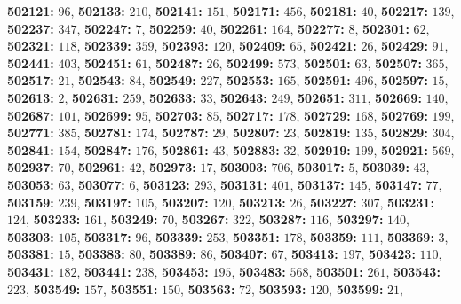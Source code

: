 \textsf{\bfseries 502121:} $96$, \textsf{\bfseries 502133:} $210$, \textsf{\bfseries 502141:} $151$, \textsf{\bfseries 502171:} $456$, \textsf{\bfseries 502181:} $40$, \textsf{\bfseries 502217:} $139$, \textsf{\bfseries 502237:} $347$, \textsf{\bfseries 502247:} $7$, \textsf{\bfseries 502259:} $40$, \textsf{\bfseries 502261:} $164$, \textsf{\bfseries 502277:} $8$, \textsf{\bfseries 502301:} $62$, \textsf{\bfseries 502321:} $118$, \textsf{\bfseries 502339:} $359$, \textsf{\bfseries 502393:} $120$, \textsf{\bfseries 502409:} $65$, \textsf{\bfseries 502421:} $26$, \textsf{\bfseries 502429:} $91$, \textsf{\bfseries 502441:} $403$, \textsf{\bfseries 502451:} $61$, \textsf{\bfseries 502487:} $26$, \textsf{\bfseries 502499:} $573$, \textsf{\bfseries 502501:} $63$, \textsf{\bfseries 502507:} $365$, \textsf{\bfseries 502517:} $21$, \textsf{\bfseries 502543:} $84$, \textsf{\bfseries 502549:} $227$, \textsf{\bfseries 502553:} $165$, \textsf{\bfseries 502591:} $496$, \textsf{\bfseries 502597:} $15$, \textsf{\bfseries 502613:} $2$, \textsf{\bfseries 502631:} $259$, \textsf{\bfseries 502633:} $33$, \textsf{\bfseries 502643:} $249$, \textsf{\bfseries 502651:} $311$, \textsf{\bfseries 502669:} $140$, \textsf{\bfseries 502687:} $101$, \textsf{\bfseries 502699:} $95$, \textsf{\bfseries 502703:} $85$, \textsf{\bfseries 502717:} $178$, \textsf{\bfseries 502729:} $168$, \textsf{\bfseries 502769:} $199$, \textsf{\bfseries 502771:} $385$, \textsf{\bfseries 502781:} $174$, \textsf{\bfseries 502787:} $29$, \textsf{\bfseries 502807:} $23$, \textsf{\bfseries 502819:} $135$, \textsf{\bfseries 502829:} $304$, \textsf{\bfseries 502841:} $154$, \textsf{\bfseries 502847:} $176$, \textsf{\bfseries 502861:} $43$, \textsf{\bfseries 502883:} $32$, \textsf{\bfseries 502919:} $199$, \textsf{\bfseries 502921:} $569$, \textsf{\bfseries 502937:} $70$, \textsf{\bfseries 502961:} $42$, \textsf{\bfseries 502973:} $17$, \textsf{\bfseries 503003:} $706$, \textsf{\bfseries 503017:} $5$, \textsf{\bfseries 503039:} $43$, \textsf{\bfseries 503053:} $63$, \textsf{\bfseries 503077:} $6$, \textsf{\bfseries 503123:} $293$, \textsf{\bfseries 503131:} $401$, \textsf{\bfseries 503137:} $145$, \textsf{\bfseries 503147:} $77$, \textsf{\bfseries 503159:} $239$, \textsf{\bfseries 503197:} $105$, \textsf{\bfseries 503207:} $120$, \textsf{\bfseries 503213:} $26$, \textsf{\bfseries 503227:} $307$, \textsf{\bfseries 503231:} $124$, \textsf{\bfseries 503233:} $161$, \textsf{\bfseries 503249:} $70$, \textsf{\bfseries 503267:} $322$, \textsf{\bfseries 503287:} $116$, \textsf{\bfseries 503297:} $140$, \textsf{\bfseries 503303:} $105$, \textsf{\bfseries 503317:} $96$, \textsf{\bfseries 503339:} $253$, \textsf{\bfseries 503351:} $178$, \textsf{\bfseries 503359:} $111$, \textsf{\bfseries 503369:} $3$, \textsf{\bfseries 503381:} $15$, \textsf{\bfseries 503383:} $80$, \textsf{\bfseries 503389:} $86$, \textsf{\bfseries 503407:} $67$, \textsf{\bfseries 503413:} $197$, \textsf{\bfseries 503423:} $110$, \textsf{\bfseries 503431:} $182$, \textsf{\bfseries 503441:} $238$, \textsf{\bfseries 503453:} $195$, \textsf{\bfseries 503483:} $568$, \textsf{\bfseries 503501:} $261$, \textsf{\bfseries 503543:} $223$, \textsf{\bfseries 503549:} $157$, \textsf{\bfseries 503551:} $150$, \textsf{\bfseries 503563:} $72$, \textsf{\bfseries 503593:} $120$, \textsf{\bfseries 503599:} $21$, 
